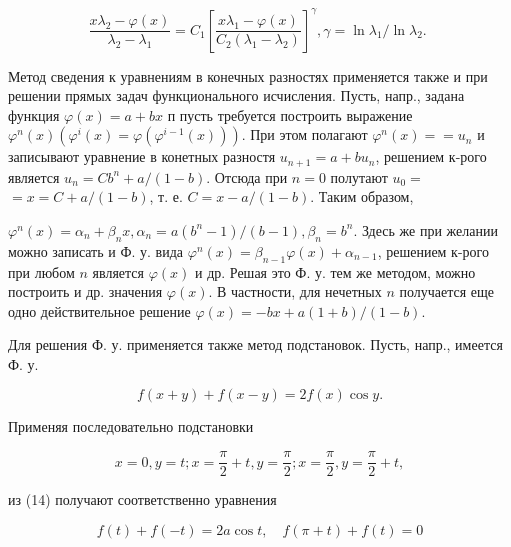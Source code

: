 \documentclass[10pt]{article}
\begin{document}
\[

\frac{x \lambda_{2}-\varphi(x)}{\lambda_{2}-\lambda_{1}}=C_{1}\left[\frac{x \lambda_{1}-\varphi(x)}{C_{2}\left(\lambda_{1}-\lambda_{2}\right)}\right]^{\gamma}, \gamma=\ln \lambda_{1} / \ln \lambda_{2} \text {. }

\]



Метод сведения к уравнениям в конечных разностях применяется также и при решении прямых задач функционального исчисления. Пусть, напр., задана функция $\varphi(x)=a+b x$ п пусть требуется построить выражение $\varphi^{n}(x)\left(\varphi^{i}(x)=\varphi\left(\varphi^{i-1}(x)\right)\right)$. При этом полагают $\varphi^{n}(x)==u_{n}$ и записывают уравнение в конетных разностя $u_{n+1}=a+b u_{n}$, решением к-рого является $u_{n}=C b^{n}+a /(1-b)$. Отсюда при $n=0$ полутают $u_{0}=$ $=x=C+a /(1-b)$, т. е. $C=x-a /(1-b)$. Таким образом,



$\varphi^{n}(x)=\alpha_{n}+\beta_{n} x, \alpha_{n}=a\left(b^{n}-1\right) /(b-1), \beta_{n}=b^{n}$. Здесь же при желании можно записать и Ф. у. вида $\varphi^{n}(x)=\beta_{n-1} \varphi(x)+\alpha_{n-1}$, решением к-рого при любом $n$ является $\varphi(x)$ и др. Решая это Ф. у. тем же методом, можно построить и др. значения $\varphi(x)$. В частности, для нечетных $n$ получается еще одно действительное решение $\varphi(x)=-b x+a(1+b) /(1-b)$.



Для решения Ф. у. применяется также метод подстановок. Пусть, напр., имеется Ф. у.



\[

f(x+y)+f(x-y)=2 f(x) \cos y .

\]



Применяя последовательно подстановки



\[

x=0, y=t ; x=\frac{\pi}{2}+t, y=\frac{\pi}{2} ; x=\frac{\pi}{2}, y=\frac{\pi}{2}+t,

\]



из (14) получают соответственно уравнения



\[

f(t)+f(-t)=2 a \cos t, \quad f(\pi+t)+f(t)=0

\]
\end{document}
